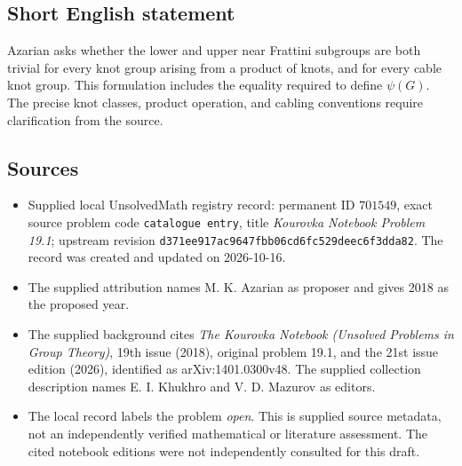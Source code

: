 \documentclass[11pt]{article}
\begin{document}
\subsection{Short English statement}
Azarian asks whether the lower and upper near Frattini subgroups are both trivial for every knot group arising from a product of knots, and for every cable knot group. This formulation includes the equality required to define \(\psi(G)\). The precise knot classes, product operation, and cabling conventions require clarification from the source.
\subsection{Sources}
\begin{itemize}
\item Supplied local UnsolvedMath registry record: permanent ID \(701549\), exact source problem code \texttt{catalogue entry}, title \emph{Kourovka Notebook Problem 19.1}; upstream revision \texttt{d371ee917ac9647fbb06cd6fc529deec6f3dda82}. The record was created and updated on 2026-10-16.
\item The supplied attribution names M. K. Azarian as proposer and gives 2018 as the proposed year.
\item The supplied background cites \emph{The Kourovka Notebook (Unsolved Problems in Group Theory)}, 19th issue (2018), original problem 19.1, and the 21st issue edition (2026), identified as arXiv:1401.0300v48. The supplied collection description names E. I. Khukhro and V. D. Mazurov as editors.
\item The local record labels the problem \emph{open}. This is supplied source metadata, not an independently verified mathematical or literature assessment. The cited notebook editions were not independently consulted for this draft.
\end{itemize}
\end{document}
